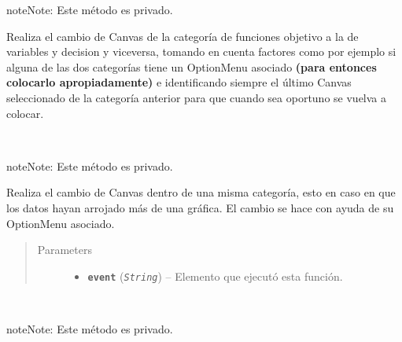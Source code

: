 \documentclass[class=report, crop=false]{standalone}
\begin{document}
\begin{fulllineitems}
\begin{fulllineitems}
\begin{notice}{note}{Note:}
Este método es privado.
\end{notice}

Realiza el cambio de Canvas de la categoría de funciones 
objetivo a la de variables y decision y viceversa, tomando 
en cuenta factores como por ejemplo si alguna de las dos 
categorías tiene un OptionMenu asociado \textbf{(para entonces colocarlo apropiadamente)} 
e identificando siempre el último Canvas seleccionado de la 
categoría anterior para que cuando sea oportuno se vuelva 
a colocar.

\end{fulllineitems}

\begin{fulllineitems}

~

\begin{notice}{note}{Note:}
Este método es privado.
\end{notice}

Realiza el cambio de Canvas dentro de una misma categoría, 
esto en caso en que los datos hayan arrojado más de una gráfica.\break
El cambio se hace con ayuda de su OptionMenu asociado.

\begin{quote}\begin{description}
\item[{Parameters}] \leavevmode\begin{itemize}
\item \textbf{\texttt{event}} (\emph{\texttt{String}}) -- Elemento que ejecutó esta función.
\end{itemize}
\end{description}\end{quote}

\end{fulllineitems}

\begin{fulllineitems}

~

\begin{notice}{note}{Note:}
Este método es privado.
\end{notice}


\end{fulllineitems}
\end{fulllineitems}
\end{document}
